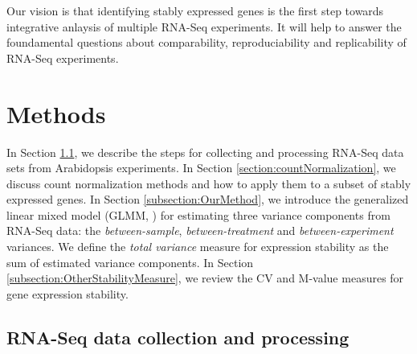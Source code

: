 \documentclass[letterpaper,12pt]{article}
\begin{document}
Our vision is that identifying stably expressed genes is the first step
towards integrative anlaysis of multiple RNA-Seq experiments. It will help to
answer the foundamental questions about comparability, reproduciability and
replicability of RNA-Seq experiments.

\section{Methods} 
\label{section:Methods}
In Section \ref{section:DataCollection}, we describe the steps for collecting
and processing RNA-Seq data sets from Arabidopsis experiments.  In Section
\ref{section:countNormalization}, we discuss count normalization methods and
how to apply them to a subset of stably expressed genes.
In Section \ref{subsection:OurMethod},  we introduce the generalized linear
mixed model (GLMM, \citealt{mcculloch2001generalized}) for estimating three
variance components from RNA-Seq data: the \textit{between-sample},
\textit{between-treatment} and \textit{between-experiment} variances.  We
define the \textit{total variance} measure for expression stability as the sum
of estimated variance components.  In Section
\ref{subsection:OtherStabilityMeasure}, we review the CV and M-value measures
for gene expression stability.



\subsection{RNA-Seq data collection and processing}\label{section:DataCollection} 
\end{document}
